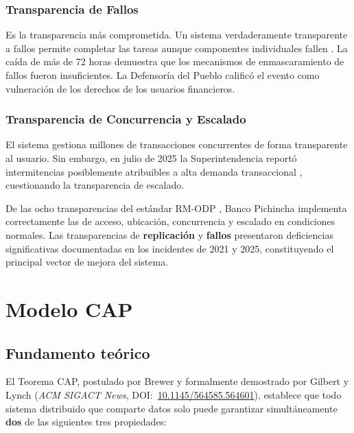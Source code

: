 \documentclass[12pt,a4paper]{article}
\begin{document}
\subsubsection{Transparencia de Fallos}
Es la transparencia m\'as comprometida. Un sistema verdaderamente transparente a fallos permite completar las tareas aunque componentes individuales fallen \cite{Coulouris2011}. La ca\'ida de m\'as de 72 horas \cite{DefensoriaPueblo2021} demuestra que los mecanismos de enmascaramiento de fallos fueron insuficientes. La Defensor\'ia del Pueblo calific\'o el evento como vulneraci\'on de los derechos de los usuarios financieros.

\subsubsection{Transparencia de Concurrencia y Escalado}
El sistema gestiona millones de transacciones concurrentes de forma transparente al usuario. Sin embargo, en julio de 2025 la Superintendencia report\'o intermitencias posiblemente atribuibles a alta demanda transaccional \cite{Ecuavisa2025}, cuestionando la transparencia de escalado.

\begin{tcolorbox}[colback=azulP!5, colframe=azulP,
                  title={\bfseries Evaluaci\'on Cr\'itica de Transparencias}]
De las ocho transparencias del est\'andar RM-ODP \cite{Coulouris2011}, Banco Pichincha implementa correctamente las de acceso, ubicaci\'on, concurrencia y escalado en condiciones normales. Las transparencias de \textbf{replicaci\'on} y \textbf{fallos} presentaron deficiencias significativas documentadas en los incidentes de 2021 y 2025, constituyendo el principal vector de mejora del sistema.
\end{tcolorbox}

\section{Modelo CAP}

\subsection{Fundamento te\'orico}

El Teorema CAP, postulado por Brewer \cite{Brewer2000} y formalmente demostrado por Gilbert y Lynch \cite{GilbertLynch2002} (\textit{ACM SIGACT News}, DOI:~\href{https://doi.org/10.1145/564585.564601}{10.1145/564585.564601}), establece que todo sistema distribuido que comparte datos solo puede garantizar simult\'aneamente \textbf{dos} de las siguientes tres propiedades:
\end{document}
